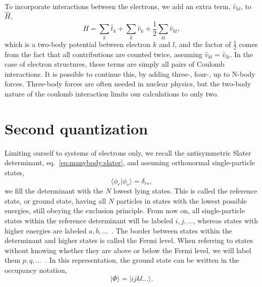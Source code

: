 \paragraph*{}
To incorporate interactions between the electrons, we add an extra term, $\hat{v}_{kl}$, to $\hat{H}$,
\begin{equation}
\label{eq:manybody:hamiltonnbody}
\hat{H} = \sum_k \hat{t}_k  + \sum_k \hat{v}_k + \frac{1}{2}\sum_{kl} \hat{v}_{kl} ,
\end{equation}
which is a two-body potential between electron $k$ and $l$, and the
factor of $\frac{1}{2}$ comes from the fact that all contributions are counted
twice, assuming $\hat{v}_{kl} = \hat{v}_{lk}$.
In the case of electron structures, these terms are simply all pairs of Coulomb interactions.
It is possible to continue this, by adding three-, four-, up to N-body forces.
Three-body forces are often needed in nuclear physics, but the two-body nature of the coulomb interaction limits our calculations to only two.




\section{Second quantization}
Limiting ourself to systems of electrons only, we recall the antisymmetric Slater determinant, eq.~\eqref{eq:manybody:slater}, and assuming orthonormal single-particle states,
\begin{equation}
\label{eq:manybody:orthonormalsp}
\langle \phi_r | \phi_s \rangle = \delta_{rs} ,
\end{equation}
we fill the determinant with the $N$ lowest lying states.
This is called the reference state, or ground state, having all $N$ particles in states with the lowest possible energies, still obeying the exclusion principle.
From now on, all single-particle states within the reference determinant will
be labeled $i,j,...$, whereas states with higher energies are labeled $a,b,...$~.
The border between states within the determinant and higher states is called the Fermi level.
When referring to states without knowing whether they are above or below the Fermi level, we will label them $p,q,...$~.
In this representation, the ground state can be written in the occupancy notation,
\begin{equation}
| \Phi \rangle = | ijkl... \rangle .
\end{equation}



